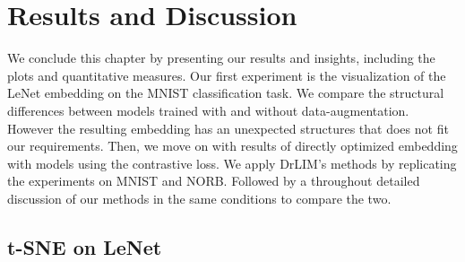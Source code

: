 \documentclass[a4paper,12pt]{report}
\begin{document}
\section{Results and Discussion}

We conclude this chapter by presenting our results and insights, including the plots and quantitative measures.
Our first experiment is the visualization of the LeNet embedding on the MNIST classification task.
We compare the structural differences between models trained with and without data-augmentation.
However the resulting embedding has an unexpected structures that does not fit our requirements.
Then, we move on with results of directly optimized embedding with models using the contrastive loss.
We apply DrLIM's methods by replicating the experiments on MNIST and NORB.
Followed by a throughout detailed discussion of our methods in the same conditions to compare the two.


\subsection{t-SNE on LeNet}
\end{document}
